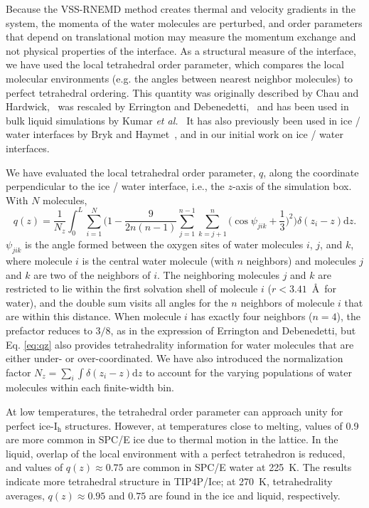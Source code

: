 Because the VSS-RNEMD method creates thermal and velocity gradients in
the system, the momenta of the water molecules are perturbed, and
order parameters that depend on translational motion may measure the
momentum exchange and not physical properties of the interface.  As a
structural measure of the interface, we have used the local
tetrahedral order parameter, which compares the local molecular
environments (e.g. the angles between nearest neighbor molecules) to
perfect tetrahedral ordering.  This quantity was originally described
by Chau and Hardwick,~\cite{Chau1998} was rescaled by Errington and
Debenedetti,~\cite{Errington2001} and has been used in bulk liquid 
simulations by Kumar \textit{et al.}~\cite{Kumar2009} It has also
previously been used in ice / water interfaces by Bryk and
Haymet~\cite{Bryk2004}, and in our initial work on ice / water
interfaces\cite{Louden2013a}.

We have evaluated the local tetrahedral order parameter, $q$, along
the coordinate perpendicular to the ice / water interface, i.e., the
$z$-axis of the simulation box. With $N$ molecules,
\begin{equation}
q(z) = \frac{1}{N_z} \int_0^L \sum_{i=1}^{N} \Bigg(1 -\frac{9}{2n(n-1)}\sum_{j=1}^{n-1}
\sum_{k=j+1}^{n} \bigg(\cos\psi_{jik}+\frac{1}{3}\bigg)^2\Bigg)
\delta(z_{i}-z)\mathrm{d}z .
\label{eq:qz}
\end{equation}
$\psi_{jik}$ is the angle formed between the oxygen sites of water
molecules $i$, $j$, and $k$, where molecule $i$ is the central water
molecule (with $n$ neighbors) and molecules $j$ and $k$ are two of the
neighbors of $i$.  The neighboring molecules $j$ and $k$ are
restricted to lie within the first solvation shell of molecule $i$
($r < 3.41$~\AA\ for water), and the double sum visits all angles for
the $n$ neighbors of molecule $i$ that are within this distance.  When
molecule $i$ has exactly four neighbors ($n=4$), the prefactor reduces
to $3/8$, as in the expression of Errington and Debenedetti, but
Eq. \eqref{eq:qz} also provides tetrahedrality information for water
molecules that are either under- or over-coordinated. We have also
introduced the normalization factor
$N_z = \sum_i \int \delta(z_i - z) \mathrm{d}z$ to account for the
varying populations of water molecules within each finite-width bin.

At low temperatures, the tetrahedral order parameter can approach
unity for perfect ice-I$_\mathrm{h}$ structures. However, at
temperatures close to melting, values of 0.9 are more common in SPC/E
ice due to thermal motion in the lattice. In the liquid, overlap of
the local environment with a perfect tetrahedron is reduced, and
values of $q(z) \approx 0.75$ are common in SPC/E water at 225~K. The
results indicate more tetrahedral structure in TIP4P/Ice; at
270~K, tetrahedrality averages, $q(z) \approx 0.95$ and $0.75$ are
found in the ice and liquid, respectively.

